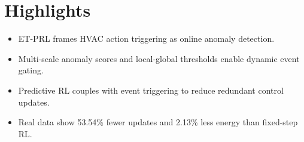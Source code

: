 \documentclass[12pt]{article}
\begin{document}
\section*{Highlights}

\begin{itemize}
\item ET-PRL frames HVAC action triggering as online anomaly detection.
\item Multi-scale anomaly scores and local-global thresholds enable dynamic event gating.
\item Predictive RL couples with event triggering to reduce redundant control updates.
\item Real data show 53.54\% fewer updates and 2.13\% less energy than fixed-step RL.
\end{itemize}
\end{document}
